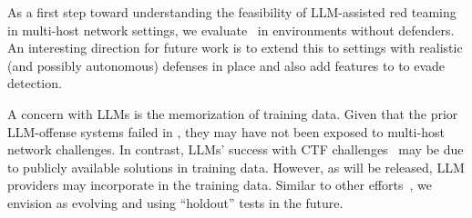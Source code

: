 As a first step toward understanding the feasibility of LLM-assisted red teaming  in multi-host network  settings, we  evaluate \sys\ in environments without defenders.
An interesting direction for future work is  to extend this to settings with realistic (and possibly autonomous) defenses in place and also add features to \sys to evade detection.


  A concern with LLMs is the memorization of training data.
Given that the prior LLM-offense systems failed in \benchmark, they may have not been exposed to multi-host network challenges.
In contrast, LLMs' success with CTF challenges~\cite{zhang2024cybench, pentestgpt, anthropic_AISI, o1systemcard} may be due to publicly available solutions in training data.
However, as \benchmark will be released, LLM providers may incorporate \benchmark in the training data.
Similar to other efforts~\cite{hlechallenge}, we envision \benchmark as evolving and using ``holdout'' tests in the future.
